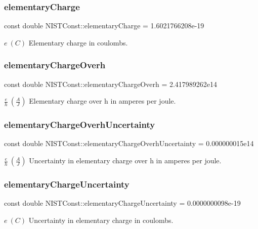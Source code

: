 \subsubsection{\texorpdfstring{elementary\+Charge}{elementaryCharge}}
{\footnotesize\ttfamily const double N\+I\+S\+T\+Const\+::elementary\+Charge = 1.\+6021766208e-\/19}

$e \ (C)$ Elementary charge in coulombs. \mbox{\label{group___elementary_charge_ga262dea92054df909a97626e3c804f1b4}} 
\subsubsection{\texorpdfstring{elementary\+Charge\+Overh}{elementaryChargeOverh}}
{\footnotesize\ttfamily const double N\+I\+S\+T\+Const\+::elementary\+Charge\+Overh = 2.\+417989262e14}

$\frac{e}{h} \ (\frac{A}{J})$ Elementary charge over h in amperes per joule. \mbox{\label{group___elementary_charge_gadc450d412ab46877fee4e29d8ccf7ce3}} 
\subsubsection{\texorpdfstring{elementary\+Charge\+Overh\+Uncertainty}{elementaryChargeOverhUncertainty}}
{\footnotesize\ttfamily const double N\+I\+S\+T\+Const\+::elementary\+Charge\+Overh\+Uncertainty = 0.\+000000015e14}

$\frac{e}{h} \ (\frac{A}{J})$ Uncertainty in elementary charge over h in amperes per joule. \mbox{\label{group___elementary_charge_ga8e2ed13fe11bd4253e61c6f893a6778d}} 
\subsubsection{\texorpdfstring{elementary\+Charge\+Uncertainty}{elementaryChargeUncertainty}}
{\footnotesize\ttfamily const double N\+I\+S\+T\+Const\+::elementary\+Charge\+Uncertainty = 0.\+0000000098e-\/19}

$e \ (C)$ Uncertainty in elementary charge in coulombs. 
